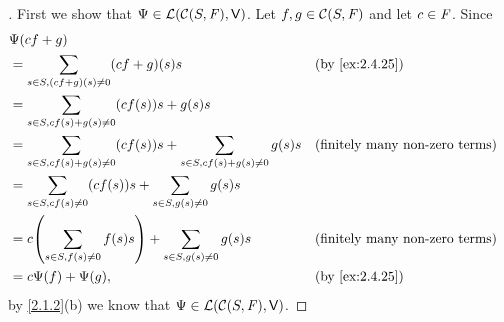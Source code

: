 \begin{proof}[]
	First we show that \(\Psi \in \mathcal{L}(\mathcal{C}(S, \mathit{F}), \mathsf{V})\).
	Let \(f, g \in \mathcal{C}(S, \mathit{F})\) and let \(c \in \mathit{F}\).
	Since
	\begin{align*}
		 & \Psi(cf + g)                                                                                                                            \\
		 & = \sum_{s \in S, (cf + g)(s) \neq 0} (cf + g)(s) s                                           &  & \by{ex:2.4.25}                        \\
		 & = \sum_{s \in S, cf(s) + g(s) \neq 0} (cf(s)) s + g(s) s                                                                                \\
		 & = \sum_{s \in S, cf(s) + g(s) \neq 0} (cf(s)) s + \sum_{s \in S, cf(s) + g(s) \neq 0} g(s) s &  & \text{(finitely many non-zero terms)} \\
		 & = \sum_{s \in S, cf(s) \neq 0} (cf(s)) s + \sum_{s \in S, g(s) \neq 0} g(s) s                                                           \\
		 & = c \pa{\sum_{s \in S, f(s) \neq 0} f(s) s} + \sum_{s \in S, g(s) \neq 0} g(s) s             &  & \text{(finitely many non-zero terms)} \\
		 & = c \Psi(f) + \Psi(g),                                                                       &  & \by{ex:2.4.25}
	\end{align*}
	by \cref{2.1.2}(b) we know that \(\Psi \in \mathcal{L}(\mathcal{C}(S, \mathit{F}), \mathsf{V})\).


\end{proof}
